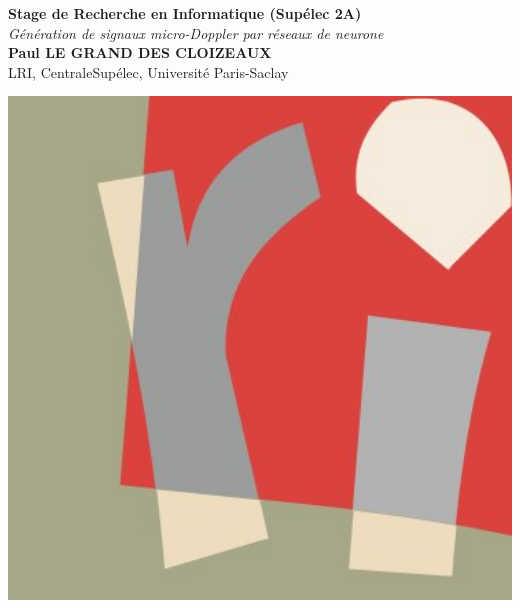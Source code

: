 \documentclass[a0,portrait]{a0poster}
\begin{document}
\large


\begin{minipage}[b]{0.8\linewidth}
\veryHuge \color{NavyBlue} \textbf{Stage de Recherche en Informatique (Sup\'e{}lec 2A)} \color{Black}\\ 
\Huge\textit{ Génération de signaux micro-Doppler par réseaux de neurone }\\[18mm]
\huge \textbf{Paul LE GRAND DES CLOIZEAUX}\\[0.5cm] 
\huge LRI, CentraleSupélec, Université Paris-Saclay\\[0.4cm] 
\end{minipage}
%
\begin{minipage}[b]{0.25\linewidth}
\includegraphics[width=15cm]{logo_lri.jpg}\\
\end{minipage}
\end{document}
